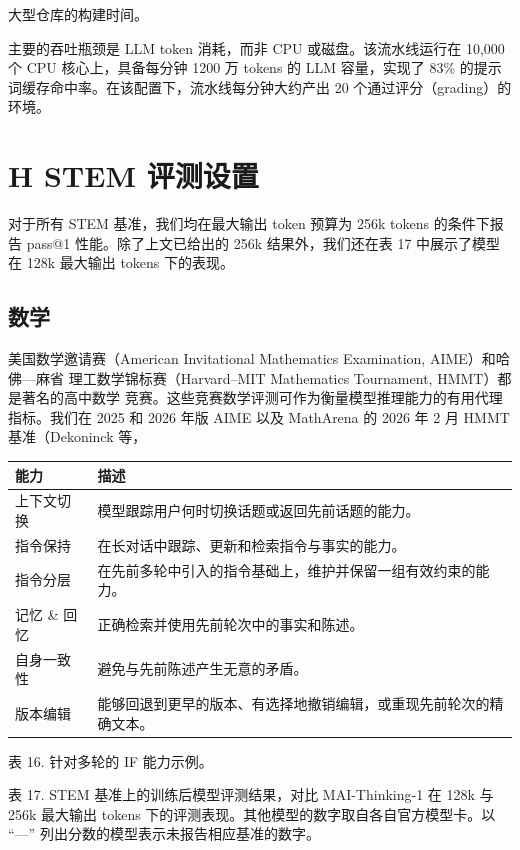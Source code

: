 \documentclass[
  10
]{article}
\newcounter{none} %
\begin{document}
大型仓库的构建时间。

主要的吞吐瓶颈是 LLM token 消耗，而非 CPU 或磁盘。该流水线运行在 10,000 个 CPU 核心上，具备每分钟 1200 万 tokens 的 LLM 容量，实现了 83\% 的提示词缓存命中率。在该配置下，流水线每分钟大约产出 20 个通过评分（grading）的环境。

\section{H STEM 评测设置}\label{h-stem-evaluations-setup}

对于所有 STEM 基准，我们均在最大输出 token 预算为 256k tokens 的条件下报告
pass@1 性能。除了上文已给出的 256k 结果外，我们还在表 17 中展示了模型在 128k
最大输出 tokens 下的表现。

\subsection{数学}\label{h.1-math}

美国数学邀请赛（American Invitational Mathematics Examination, AIME）和哈佛---麻省
理工数学锦标赛（Harvard--MIT Mathematics Tournament, HMMT）都是著名的高中数学
竞赛。这些竞赛数学评测可作为衡量模型推理能力的有用代理指标。我们在 2025 和 2026
年版 AIME 以及 MathArena 的 2026 年 2 月 HMMT 基准（Dekoninck 等，



{\def\LTcaptype{none} %
\begin{longtable}[]{@{}|l|l|@{}}
\toprule\noalign{}
\endhead
\bottomrule\noalign{}
\endlastfoot
\hline
能力 & 描述 \\
\hline
上下文切换 & 模型跟踪用户何时切换话题或返回先前话题的能力。 \\
\hline
指令保持 & 在长对话中跟踪、更新和检索指令与事实的能力。 \\
\hline
指令分层 & 在先前多轮中引入的指令基础上，维护并保留一组有效约束的能力。 \\
\hline
记忆 \& 回忆 & 正确检索并使用先前轮次中的事实和陈述。 \\
\hline
自身一致性 & 避免与先前陈述产生无意的矛盾。 \\
\hline
版本编辑 & 能够回退到更早的版本、有选择地撤销编辑，或重现先前轮次的精确文本。 \\
\hline
\end{longtable}
}

表 16. 针对多轮的 IF 能力示例。

表 17. STEM 基准上的训练后模型评测结果，对比 MAI-Thinking-1 在 128k 与 256k
最大输出 tokens 下的评测表现。其他模型的数字取自各自官方模型卡。以 ``---''
列出分数的模型表示未报告相应基准的数字。
\end{document}
